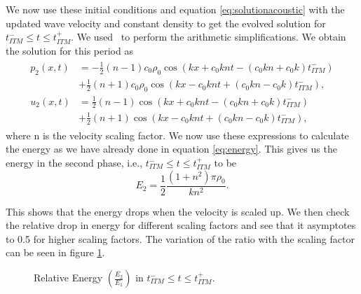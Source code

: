 We now use these initial conditions and equation \ref{eq:solutionacoustic} with the updated wave velocity and constant density to get the evolved solution for $t_{ITM}^- \leq t \leq t_{ITM}^+ $. We used~\parencite{sagemath} to perform the arithmetic simplifications. We obtain the solution for this period as
\begin{align}
    \begin{split}
        p_{2}\left(x, t\right) &= -\frac{1}{2} \left(n-1\right)c_0\rho_0 \cos\left(kx + c_0knt - \left(c_0kn + c_0k\right)t_{ITM}^-\right) \\
        &+ \frac{1}{2} \left(n+1\right)c_0\rho_0\cos\left(kx - c_0knt + \left(c_0kn - c_0k\right)t_{ITM}^-\right), \\
        u_{2}\left(x, t\right) &= \frac{1}{2}\left(n-1\right)\cos\left(kx + c_0knt - \left(c_0kn + c_0k\right)t_{ITM}^-\right)\\
        &+ \frac{1}{2}\left(n+1\right)\cos\left(kx - c_0knt + \left(c_0kn-c_0k\right)t_{ITM}^-\right) ,
    \end{split}
\end{align}
where n is the velocity scaling factor. We now use these expressions to calculate the energy as we have already done in equation \ref{eq:energy}. This gives us the energy in the second phase, i.e., $t_{ITM}^- \leq t \leq t_{ITM}^+ $ to be
\begin{equation}
    E_2 = \frac{1}{2}\frac{\left(1 + n^2\right)\pi \rho_0}{kn^2} .
\end{equation}

This shows that the energy drops when the velocity is scaled up. We then check the relative drop in energy for different scaling factors and see that it asymptotes to 0.5 for higher scaling factors. The variation of the ratio with the scaling factor can be seen in figure \ref{fig:ratio1}.

\begin{figure}[!htpb]
    \centering
    \caption{Relative Energy $\left(\frac{E_2}{E_1}\right)$ in $t_{ITM}^- \leq t \leq t_{ITM}^+$. }
    \label{fig:ratio1}
\end{figure}

